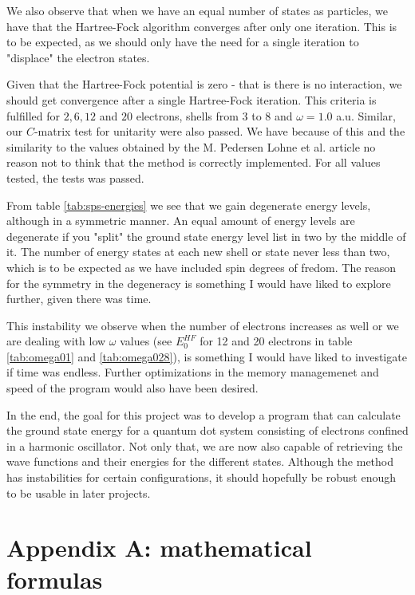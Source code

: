 \documentclass[11pt]{article}
\begin{document}
We also observe that when we have an equal number of states as particles, we have that the Hartree-Fock algorithm converges after only one iteration. This is to be expected, as we should only have the need for a single iteration to "displace" the electron states.

Given that the Hartree-Fock potential is zero - that is there is no interaction, we should get convergence after a single Hartree-Fock iteration. This criteria is fulfilled for $2,6,12$ and $20$ electrons, shells from $3$ to $8$ and $\omega=1.0$ a.u. Similar, our $C$-matrix test for unitarity were also passed. We have because of this and the similarity to the values obtained by the M. Pedersen Lohne et al. article \cite{PhysRevB.84.115302} no reason not to think that the method is correctly implemented. For all values tested, the tests was passed.

From table \ref{tab:sps-energies} we see that we gain degenerate energy levels, although in a symmetric manner. An equal amount of energy levels are degenerate if you "split" the ground state energy level list in two by the middle of it. The number of energy states at each new shell or state never less than two, which is to be expected as we have included spin degrees of fredom. The reason for the symmetry in the degeneracy is something I would have liked to explore further, given there was time.

This instability we observe when the number of electrons increases as well or we are dealing with low $\omega$ values (see $E^{HF}_0$ for 12 and 20 electrons in table \ref{tab:omega01} and \ref{tab:omega028}), is something I would have liked to investigate if time was endless. Further optimizations in the memory managemenet and speed of the program would also have been desired.

In the end, the goal for this project was to develop a program that can calculate the ground state energy for a quantum dot system consisting of electrons confined in a harmonic oscillator. Not only that, we are now also capable of retrieving the wave functions and their energies for the different states. Although the method has instabilities for certain configurations, it should hopefully be robust enough to be usable in later projects.

\section{Appendix A: mathematical formulas}
\end{document}
